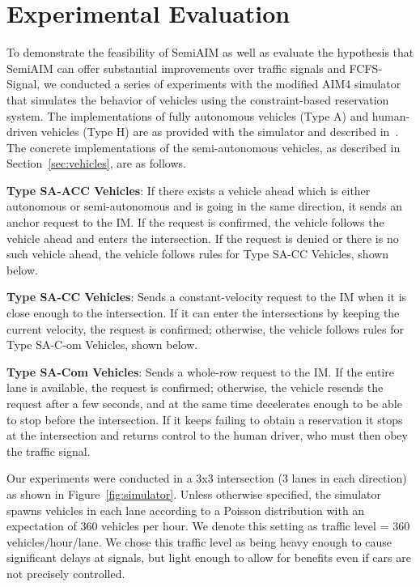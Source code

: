 \section{Experimental Evaluation}
\label{sec:simulation}

To demonstrate the feasibility of SemiAIM as well as evaluate the
hypothesis that SemiAIM can offer substantial improvements over
traffic signals and FCFS-Signal, we conducted a series of experiments
with the modified AIM4 simulator that simulates the behavior of
vehicles using the constraint-based reservation system.  The
implementations of fully autonomous vehicles (Type A) and human-driven
vehicles (Type H) are as provided with the simulator and described
in~\cite{bib:Dresner08Multiagent}.  The concrete implementations of
the semi-autonomous vehicles, as described in
Section~\ref{sec:vehicles}, are as follows.

\begin{small_ind_s_itemize}

\item \textbf{Type SA-ACC Vehicles}: If there exists a vehicle ahead
which is either autonomous or semi-autonomous and is going in the same
direction, it sends an anchor request to the IM.  If the request is
confirmed, the vehicle follows the vehicle ahead and enters the
intersection.  If the request is denied or there is no such vehicle
ahead, the vehicle follows rules for Type SA-CC Vehicles, shown below.

\item \textbf{Type SA-CC Vehicles}:
Sends a constant-velocity request to the IM when it is close
enough to the intersection. If it can enter the intersections by
keeping the current velocity, the request is confirmed; otherwise, the
vehicle follows rules for Type SA-C-om Vehicles, shown below.

\item \textbf{Type SA-Com Vehicles}:
Sends a whole-row request to the IM.  If the entire lane is
available, the request is confirmed; otherwise, the vehicle resends the
request after a few seconds, and at the same time decelerates enough to
be able to stop before the intersection. 
If it keeps failing to obtain a reservation it stops at
the intersection and returns control to the human driver, who must
then obey the traffic signal.
\end{small_ind_s_itemize}

Our experiments were conducted in a 3x3 intersection (3 lanes
in each direction) as shown in Figure~\ref{fig:simulator}.  Unless otherwise specified, the simulator spawns vehicles in each lane according
to a Poisson distribution with an expectation of 360 vehicles per
hour.  We denote this setting as traffic level = 360
vehicles/hour/lane.  We chose this traffic level as being heavy enough
to cause significant delays at signals, but light enough to allow for
benefits even if cars are not precisely
controlled. 

